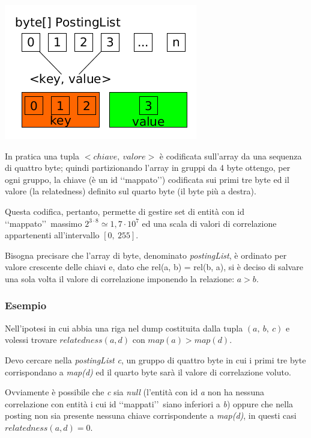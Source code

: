 \begin{center}
    \includegraphics[scale=0.55]{Sources/Img/c02_01.png}
\end{center}

In pratica una tupla $<chiave,\ valore>$ è codificata sull'array da una sequenza di quattro byte; quindi partizionando l'array in gruppi da 4 byte 
ottengo, per ogni gruppo, la chiave (è un id \lq\lq mappato\rq\rq ) codificata sui primi tre byte ed il valore (la relatedness) definito sul quarto byte (il byte più a destra).

Questa codifica, pertanto, permette di gestire set di entità con id \lq\lq mappato\rq\rq\ massimo $2^{3 \cdot 8} \simeq 1,7 \cdot 10^7$ ed una scala di valori 
di correlazione appartenenti all'intervallo $[0,\ 255]$.

Bisogna precisare che l'array di byte, denominato \textit{postingList}, è ordinato per valore crescente delle chiavi e, dato che rel(a, b) = rel(b, a),
si è deciso di salvare una sola volta il valore di correlazione imponendo la relazione: $a > b$.

\subsubsection{Esempio}
Nell'ipotesi in cui abbia una riga nel dump costituita dalla tupla $(a,\ b,\ c)$ e volessi trovare $relatedness(a, d)$ con $map(a) > map(d)$. 

Devo cercare nella \textit{postingList c}, un gruppo di quattro byte in cui i primi tre byte corrispondano a \textit{map(d)} ed il quarto byte sarà il valore di correlazione voluto. 

Ovviamente è possibile che \textit{c} sia \textit{null} (l'entità con id \textit{a} non ha nessuna correlazione con entità i cui id \lq\lq mappati\rq\rq\ siano inferiori a \textit{b}) oppure 
che nella posting non sia presente nessuna chiave corrispondente a \textit{map(d)}, in questi casi $relatedness(a,d) = 0$. 

